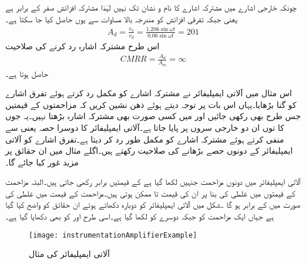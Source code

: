 چونکہ خارجی اشارے میں مشترکہ اشارے کا نام و نشان تک نہیں لہٰذا مشترکہ افزائش صفر کے برابر ہے یعنی  جبکہ تفرقی افزائش کو مندرجہ بالا مساوات سے یوں حاصل کیا جا سکتا ہے۔
\begin{align*}
A_d=\frac{v_o}{v_d}=\frac{1.206 \sin \omega t}{0.06 \sin \omega t}=201
\end{align*}
اس طرح مشترکہ اشارہ رد کرنے کی صلاحیت
\begin{align*}
CMRR=\frac{A_d}{A_m}=\infty
\end{align*}
حاصل ہوتا ہے۔

اس مثال میں آلاتی ایمپلیفائر نے مشترکہ اشارے کو مکمل رد کرتے ہوئے تفرق اشارے کو  گنا بڑھایا۔یہاں اس بات پر توجہ دیتے ہوئے ذھن نشین کریں کہ مزاحمتوں کے قیمتیں جس طرح بھی رکھی جائیں  اور  میں کسی صورت بھی مشترکہ اشارہ بڑھتا نہیں۔یہ جوں کا توں ان دو خارجی سروں  پر پایا جاتا ہے۔آلاتی ایمپلیفائر کا دوسرا حصہ یعنی   سے  منفی کرتے ہوئے مشترکہ اشارے کو مکمل طور رد کر دیتا ہے۔تفرق اشارے کو آلاتی ایمپلیفائر کے دونوں حصے بڑھانے کی صلاحیت رکھتے ہیں۔اگلے مثال میں ان حقائق پر مزید غور کیا جائے گا۔

آلاتی ایمپلیفائر میں دونوں مزاحمت جنہیں  لکھا گیا ہے کے قیمتیں برابر رکھی جاتی ہیں۔البتہ مزاحمت کے قیمتوں میں غلطی کی بنا پر ان کی قیمت
  تا   ممکن ہوتی ہیں۔مزاحمت کے قیمت میں  غلطی کی صورت میں  کے برابر ہو گا ۔شکل  میں آلاتی ایمپلیفائر کو دوبارہ دکھاتے ہوئے ان حقائق کو واضح کیا گیا ہے جہاں ایک مزاحمت کو  جبکہ دوسرے کو  لکھا گیا ہے۔اسی طرح اور  کو بھی دکھایا گیا ہے۔
\begin{figure}
\centering
\texttt{[image: instrumentationAmplifierExample]}
\caption{آلاتی ایمپلیفائر کی مثال}
\label{شکل_آلاتی_ایمپلیفائر_مثال}
\end{figure}

